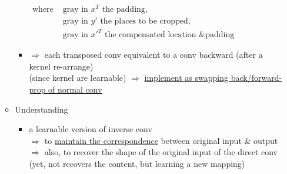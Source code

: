 \begin{itemize}
\begin{itemize}
\begin{itemize}
\begin{minipage}[r]{.45\linewidth}
		\end{minipage} \\
		$\begin{alignedat}{1}
		\text{where }&\text{gray in } x^T \text{ the padding,} \\
		&\text{gray in } y' \text{ the places to be cropped,} \\ 
		&\text{gray in } x'^T \text{ the compensated location \& padding} 
		\end{alignedat}$ \\
		\item $\Rightarrow$ each transposed conv equivalent to a conv backward (after a kernel re-arrange) \\
		(since kernel are learnable)
		$\Rightarrow$ \underline{implement as swapping back/forward-prop of normal conv} \\
		\end{itemize}
	\item Understanding
		\begin{itemize}
		\item a learnable version of inverse conv \\
		$\Rightarrow$ to \underline{maintain the correspondence} between original input \& output \\
		$\Rightarrow$ also, to recover the shape of the original input of the direct conv \\
		(yet, not recovers the content, but learning a new mapping)
		\end{itemize}
	\end{itemize}


\end{itemize}
